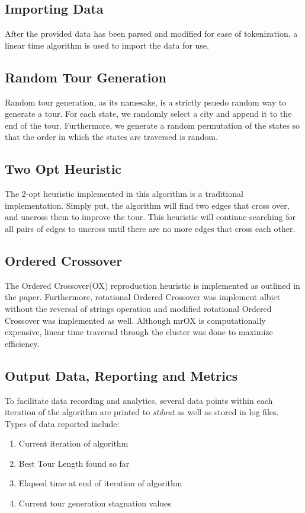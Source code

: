 \documentclass[12pt]{article}
\begin{document}
\subsection{Importing Data}

After the provided data has been parsed and modified for ease of tokenization, a linear time algorithm is used to import the data for use. 

\subsection{Random Tour Generation}

Random tour generation, as its namesake, is a strictly psuedo random way to generate a tour. For each state, we randomly select a city and append it to the end of the tour. Furthermore, we generate a random permutation of the states so that the order in which the states are traversed is random.

\subsection{Two Opt Heuristic}

The 2-opt heuristic implemented in this algorithm is a traditional implementation. Simply put, the algorithm will find two edges that cross over, and uncross them to improve the tour. This heuristic will continue searching for all pairs of edges to uncross until there are no more edges that cross each other.
\subsection{Ordered Crossover}

The Ordered Crossover(OX) reproduction heuristic is implemented as outlined in the paper. Furthermore, rotational Ordered Crossover was implement albiet without the reversal of strings operation and modified rotational Ordered Crossover was implemented as well. Although mrOX is computationally expensive, linear time traversal through the cluster was done to maximize efficiency. 

\subsection{Output Data, Reporting and Metrics}

To facilitate data recording and analytics, several data points within each iteration of the algorithm are printed to \textit{stdout} as well as stored in log files. Types of data reported include:
\begin{enumerate}
  \item Current iteration of algorithm
  \item Best Tour Length found so far
  \item Elapsed time at end of iteration of algorithm
  \item Current tour generation stagnation values
\end{enumerate}
\end{document}
